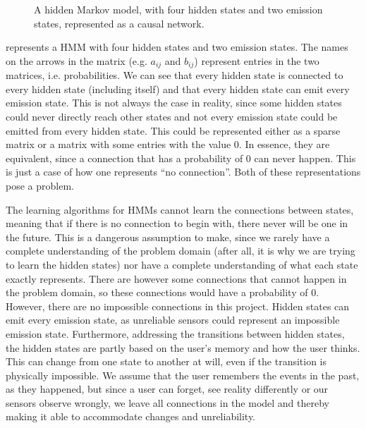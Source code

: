 \begin{figure}[htbp]
\caption[A HMM represented as a causal network.]{A hidden Markov model, with four hidden states and two emission states, represented as a causal network.}\label{fig:HMMCausalNet}
\end{figure}

 represents a HMM with four hidden states and two emission states. The names on the arrows in the matrix (e.g. $a_{ij}$ and $b_{ij}$) represent entries in the two matrices, i.e. probabilities. We can see that every hidden state is connected to every hidden state (including itself) and that every hidden state can emit every emission state. This is not always the case in reality, since some hidden states could never directly reach other states and not every emission state could be emitted from every hidden state. This could be represented either as a sparse matrix or a matrix with some entries with the value 0. In essence, they are equivalent, since a connection that has a probability of 0 can never happen. This is just a case of how one represents \enquote{no connection}. Both of these representations pose a problem.

The learning algorithms for HMMs cannot learn the connections between states, meaning that if there is no connection to begin with, there never will be one in the future. This is a dangerous assumption to make, since we rarely have a complete understanding of the problem domain (after all, it is why we are trying to learn the hidden states) nor have a complete understanding of what each state exactly represents. There are however some connections that cannot happen in the problem domain, so these connections would have a probability of $0$. However, there are no impossible connections in this project. Hidden states can emit every emission state, as unreliable sensors could represent an impossible emission state. Furthermore, addressing the transitions between hidden states, the hidden states are partly based on the user's memory and how the user thinks. This can change from one state to another at will, even if the transition is physically impossible. We assume that the user remembers the events in the past, as they happened, but since a user can forget, see reality differently or our sensors observe wrongly, we leave all connections in the model and thereby making it able to accommodate changes and unreliability.

